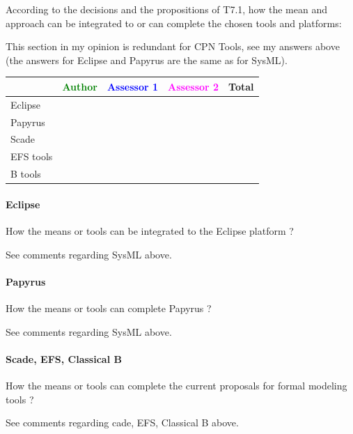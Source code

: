 According to the decisions and the propositions of T7.1, how the mean and approach can be integrated to or can complete the chosen tools and platforms:

\begin{author_comment}
This section in my opinion is redundant for CPN Tools, see my answers above (the answers for Eclipse and Papyrus are the same as for SysML).
\end{author_comment}

\begin{tabular}{|l | c | c | c | c|}
\hline
& \textcolor{green}{Author} & \textcolor{blue}{Assessor 1} & \textcolor{magenta}{Assessor 2} & Total \\
\hline 
Eclipse & & & &  \\
\hline
Papyrus  & & & & \\
\hline
Scade & & & & \\
\hline
EFS tools & & & & \\
\hline
B tools & & & & \\
\hline
\end{tabular}

\paragraph{Eclipse}
How the means or tools can be integrated to the Eclipse platform ?

\begin{author_comment}
See comments regarding SysML above.
\end{author_comment}

\paragraph{Papyrus}
How the means or tools can complete  Papyrus ?

\begin{author_comment}
See comments regarding SysML above.
\end{author_comment}


\paragraph{Scade, EFS, Classical B}
How the means or tools can complete the current proposals for formal modeling tools ?

\begin{author_comment}
See comments regarding cade, EFS, Classical B above.
\end{author_comment}


